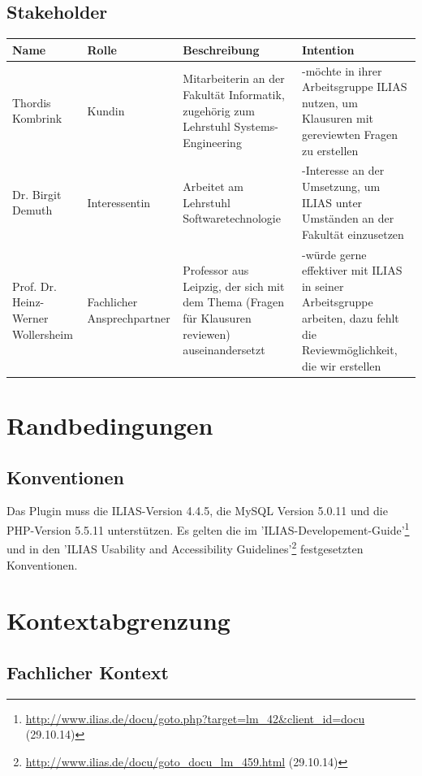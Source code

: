 \documentclass[a4paper]{scrreprt}
\begin{document}
\section{Stakeholder}

\begin{tabular}{|p{3.5cm}|p{2.3cm}|p{3cm}|p{4cm}|}\hline
Name & Rolle & Beschreibung & Intention \\\hline
Thordis Kombrink & Kundin & Mitarbeiterin an der Fakultät Informatik, zugehörig zum Lehrstuhl Systems-Engineering & -möchte in ihrer Arbeitsgruppe ILIAS nutzen, um Klausuren mit gereviewten Fragen zu erstellen\\\hline
Dr. Birgit Demuth & Interessentin & Arbeitet am Lehrstuhl Softwaretechnologie & -Interesse an der Umsetzung, um ILIAS unter Umständen an der Fakultät einzusetzen\\\hline
Prof. Dr. Heinz-Werner Wollersheim & Fachlicher Ansprechpartner & Professor aus Leipzig, der sich mit dem Thema (Fragen für Klausuren reviewen) auseinandersetzt & -würde gerne effektiver mit ILIAS in seiner Arbeitsgruppe arbeiten, dazu fehlt die Reviewmöglichkeit, die wir erstellen\\\hline
\end{tabular}

\chapter{Randbedingungen}

\section{Konventionen} 

Das Plugin muss die ILIAS-Version 4.4.5, die MySQL Version 5.0.11 und die PHP-Version 5.5.11 unterstützen.
Es gelten die im 'ILIAS-Developement-Guide'\footnote{\url{http://www.ilias.de/docu/goto.php?target=lm_42&client_id=docu} (29.10.14)} und in den 'ILIAS Usability and Accessibility Guidelines'\footnote{\url{http://www.ilias.de/docu/goto_docu_lm_459.html} (29.10.14)} festgesetzten Konventionen.

\chapter{Kontextabgrenzung}

\section{Fachlicher Kontext}
\end{document}
